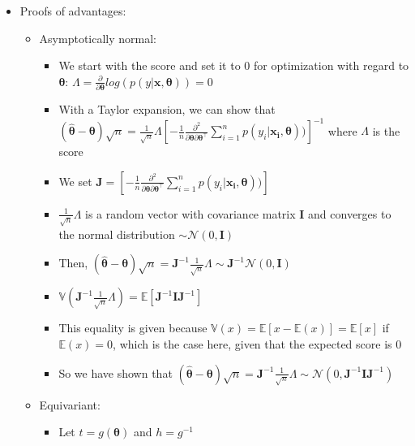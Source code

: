 \begin{itemize}
\begin{itemize}
    \end{itemize}
    \item Proofs of advantages:
    \begin{itemize}
        \item Asymptotically normal: 
        \begin{itemize}
            \item We start with the score and set it to 0 for optimization with regard to $\boldsymbol{\theta}$: 
            $\Lambda = \frac{\partial}{\partial \boldsymbol{\theta}} log(p(y |\boldsymbol{x}, \boldsymbol{\theta})) = 0$
            \item With a Taylor expansion, we can show that $( \hat{\boldsymbol{\theta}} - \boldsymbol{\theta} ) \sqrt{n} = \frac{1}{\sqrt{n}} \Lambda [ -\frac{1}{n} \frac{\partial^2}{\partial \boldsymbol{\theta} \partial \boldsymbol{\theta}^\intercal} \sum_{i=1}^n p(y_i |\boldsymbol{x_i}, \boldsymbol{\theta})) ]^{-1}$ where $\Lambda$ is the score 
            \item We set $\boldsymbol{J} = [ -\frac{1}{n} \frac{\partial^2}{\partial \boldsymbol{\theta} \partial \boldsymbol{\theta}^\intercal} \sum_{i=1}^n p(y_i |\boldsymbol{x_i}, \boldsymbol{\theta})) ]$
            \item $\frac{1}{\sqrt{n}} \Lambda$ is a random vector with covariance matrix $\boldsymbol{I}$ and converges to the normal distribution $\sim \mathcal{N}(0,\boldsymbol{I})$
            \item Then, $( \hat{\boldsymbol{\theta}} - \boldsymbol{\theta} ) \sqrt{n} = \boldsymbol{J}^{-1} \frac{1}{\sqrt{n}} \Lambda \sim \boldsymbol{J}^{-1}\mathcal{N}(0,\boldsymbol{I})$
            \item $\mathbb{V}(\boldsymbol{J}^{-1} \frac{1}{\sqrt{n}} \Lambda) = \mathbb{E}[\boldsymbol{J}^{-1}  \boldsymbol{I} \boldsymbol{J}^{-1}]$ 
            \item This equality is given because $\mathbb{V}(x) = \mathbb{E}[x-\mathbb{E}(x)] = \mathbb{E}[x]$ if $\mathbb{E}(x) = 0$, which is the case here, given that the expected score is $0$
            \item So we have shown that $(\hat{\boldsymbol{\theta}} - \boldsymbol{\theta} ) \sqrt{n} = \boldsymbol{J}^{-1} \frac{1}{\sqrt{n}} \Lambda \sim \mathcal{N}(0,\boldsymbol{J}^{-1}\boldsymbol{I}\boldsymbol{J}^{-1})$
        \end{itemize}
        \item Equivariant: 
        \begin{itemize}
            \item Let $t = g(\boldsymbol{\theta})$ and $h = g^{-1}$ 

\end{itemize}
\end{itemize}
\end{itemize}
